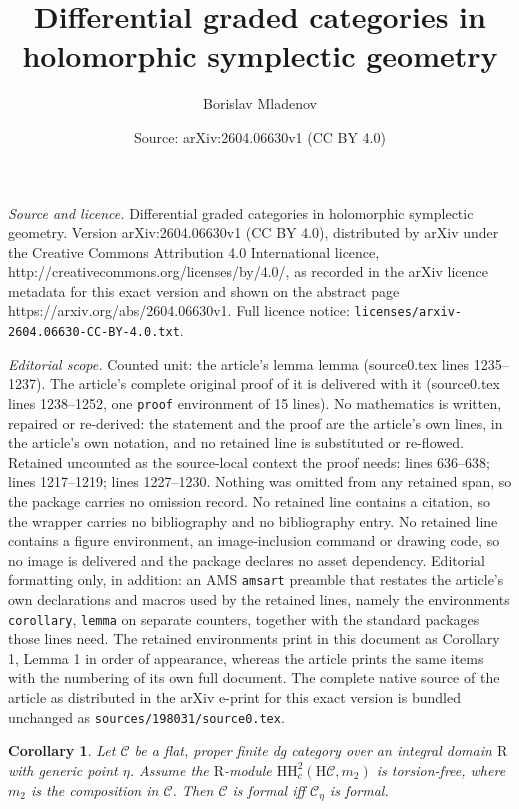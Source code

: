 \documentclass[10pt,a4paper]{amsart}
\title{\vspace{-1cm}Differential graded categories in holomorphic symplectic geometry}
\author{Borislav Mladenov}
\date{Source: arXiv:2604.06630v1 (CC BY 4.0)}
\newtheorem{corollary}{Corollary}
\newcommand{\Cc}{\mathcal C}
\newcommand{\mr}{\mathrm}
\begin{document}
\maketitle

\noindent\emph{Source and licence.} \vspace{-1cm}Differential graded categories in holomorphic symplectic geometry. Version arXiv:2604.06630v1 (CC BY 4.0), distributed by arXiv under the Creative Commons Attribution 4.0 International licence, http://creativecommons.org/licenses/by/4.0/, as recorded in the arXiv licence metadata for this exact version and shown on the abstract page https://arxiv.org/abs/2604.06630v1. Full licence notice: \texttt{licenses/arxiv-2604.06630-CC-BY-4.0.txt}.\par\smallskip

\noindent\textit{Editorial scope.} Counted unit: the article's lemma lemma (source0.tex lines 1235--1237). The article's complete original proof of it is delivered with it (source0.tex lines 1238--1252, one \texttt{proof} environment of 15 lines). No mathematics is written, repaired or re-derived: the statement and the proof are the article's own lines, in the article's own notation, and no retained line is substituted or re-flowed.  Retained uncounted as the source-local context the proof needs: lines 636--638; lines 1217--1219; lines 1227--1230.  Nothing was omitted from any retained span, so the package carries no omission record.  No retained line contains a citation, so the wrapper carries no bibliography and no bibliography entry.  No retained line contains a figure environment, an image-inclusion command or drawing code, so no image is delivered and the package declares no asset dependency.  Editorial formatting only, in addition: an AMS \texttt{amsart} preamble that restates the article's own declarations and macros used by the retained lines, namely the environments \texttt{corollary}, \texttt{lemma} on separate counters, together with the standard packages those lines need.  The retained environments print in this document as Corollary 1, Lemma 1 in order of appearance, whereas the article prints the same items with the numbering of its own full document.  The complete native source of the article as distributed in the arXiv e-print for this exact version is bundled unchanged as \texttt{sources/198031/source0.tex}.
\begin{corollary}\label{a2dg}
Let $\Cc$ be a flat, proper finite dg category over an integral domain $\mr{R}$ with generic point $\eta$. Assume the $\mr{R}$-module $\mr{HH}^2_c(\mr{H}\Cc,m_2)$ is torsion-free, where $m_2$ is the composition in $\Cc$. Then $\Cc$ is formal iff $\Cc_\eta$ is formal.
\end{corollary}
\end{document}
